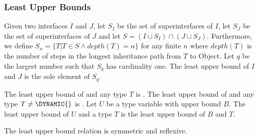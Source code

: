 \documentclass{article}
\newcommand{\code}[1]{{\sf #1}}
\begin{document}
\subsubsection{Least Upper Bounds}

\LMHash{}
Given two interfaces $I$ and $J$, let $S_I$ be the set of superinterfaces of $I$,  let $S_J$ be the set of superinterfaces of $J$ and let $S =  (I \cup S_I) \cap (J \cup S_J)$.  Furthermore, we define $S_n = \{T | T \in S  \wedge depth(T) =n\}$ for any finite $n$ %
where $depth(T)$ is the number of steps in the longest inheritance path from $T$ to \code{Object}. Let $q$ be the largest number such that $S_q$ has cardinality one. The least upper bound of $I$ and $J$ is the sole element of  $S_q$.

\LMHash{}
The least upper bound of \DYNAMIC{} and any type $T$ is \DYNAMIC{}.
The least upper bound of \VOID{} and any type $T \ne \DYNAMIC{}$ is \VOID{}.
Let $U$ be a type variable with upper bound $B$. The least upper bound of $U$ and a type $T$ is the least upper bound of $B$ and $T$. 

\LMHash{}
The least upper bound relation is symmetric and reflexive.

\end{document}
